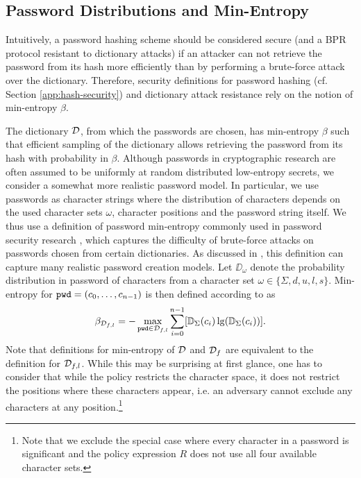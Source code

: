 \subsection{Password Distributions and Min-Entropy} \label{sec:min-entropy}
Intuitively, a password hashing scheme should be considered secure (and a BPR protocol resistant to dictionary attacks) if an attacker can not retrieve the password from its hash more efficiently than by performing a brute-force attack over the dictionary. Therefore, security definitions for password hashing (cf. Section \ref{app:hash-security}) and dictionary attack resistance rely on the notion of min-entropy $\beta$.

The dictionary $\mathcal{D}$, from which the passwords are chosen, has min-entropy $\beta$ such that efficient sampling of the dictionary allows retrieving the password from its hash with probability in $\beta$.
Although passwords in cryptographic research are often assumed to be uniformly at random distributed low-entropy secrets, we consider a somewhat more realistic password model.
In particular, we use passwords as character strings where the distribution of characters depends on the used character sets $\omega$, character positions and the password string itself.
We thus use a definition of password min-entropy commonly used in password security research \cite{ShayKKLMBCC10,KomanduriSKMBCCE11,MazurekKVBCCKSU13}, which captures the difficulty of brute-force attacks on passwords chosen from certain dictionaries.
As discussed in \cite{ShayKKLMBCC10,KomanduriSKMBCCE11}, this definition can capture many realistic password creation models.
Let $\DD_\omega$ denote the probability distribution in password \pwd of characters from a character set $\omega\in\{\Sigma,d,u,l,s\}$.
Min-entropy for $\mathtt{pwd}=(c_0,\dots,c_{n-1})$ is then defined according to \citet{shannon48} as
\[
  \beta_{\mathcal{D}_{f,l}} = -\max_{\mathtt{pwd}\in \mathcal{D}_{f,l}} \sum_{i=0}^{n-1} [\mathbb{D}_\Sigma(c_i)\lg(\mathbb{D}_\Sigma(c_i))].
\]
Note that definitions for min-entropy of $\mathcal{D}$ and $\mathcal{D}_f$ are equivalent to the definition for $\mathcal{D}_{f,l}$.
While this may be surprising at first glance, one has to consider that while the policy restricts the character space, it does not restrict the positions where these characters appear, i.e. an adversary cannot exclude any characters at any position.\footnote{Note that we exclude the special case where every character in a password is significant and the policy expression $R$ does not use all four available character sets.}

